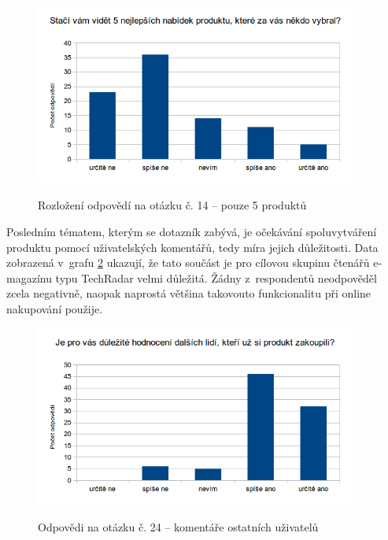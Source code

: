 \documentclass[12pt,twoside,openany]{fithesis}
\begin{document}
            \begin{figure}[hbt]
                \hypertarget{fig-top-5}{}%
                \begin{center}

                    
{{\includegraphics[width=400px]{img/top-5}}\hypertarget{idp55050896}{}%
                        \label{idp55050896}
                    }
                    {{\caption[{Rozložení odpovědí na otázku č. 14 -- 
pouze 5 produktů}]{{{Rozložení odpovědí na otázku č. 14 -- pouze 5 
produktů}}}\label{fig-top-5}}}
                \end{center}
            \end{figure}

            Posledním tématem, kterým se dotazník zabývá, je 
očekávání spoluvytváření produktu pomocí uživatelských komentářů, 
tedy míra jejich důležitosti. Data zobrazená v~grafu 
\hyperlink{fig-user-reviews}{{\ref{fig-user-reviews}}} ukazují, že tato 
součást je pro cílovou skupinu čtenářů e-magazínu typu TechRadar velmi 
důležitá. Žádny z~respondentů neodpověděl zcela negativně, naopak 
naprostá většina takovouto funkcionalitu při online nakupování použije.

            \begin{figure}[hbt]
                \hypertarget{fig-user-reviews}{}%
                \begin{center}

                    
{{\includegraphics[width=400px]{img/user-reviews}}\hypertarget{idp55055696}{}%
                        \label{idp55055696}
                    }
                    {{\caption[{Odpovědi na otázku č. 24 -- komentáře 
ostatních uživatelů}]{{{Odpovědi na otázku č. 24 -- komentáře 
ostatních uživatelů}}}\label{fig-user-reviews}}}
                \end{center}
            \end{figure}
\end{document}
